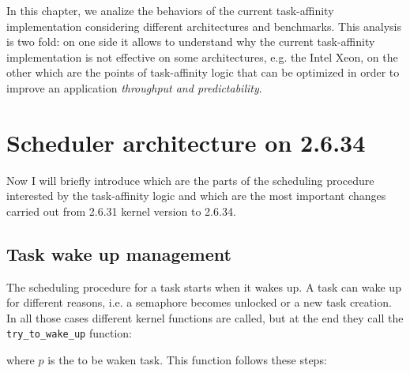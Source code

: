 In this chapter, we analize the behaviors of the current task-affinity
implementation considering different architectures and benchmarks.  This
analysis is two fold: on one side it allows to understand why the current
task-affinity implementation is not effective on some architectures, e.g. the
Intel Xeon, on the other which are the points of task-affinity logic that can be
optimized in order to improve an application \emph{throughput and
predictability}.

\section{Scheduler architecture on 2.6.34}

Now I will briefly introduce which are the parts of the scheduling procedure 
interested by the task-affinity logic and which are the most important changes 
carried out from 2.6.31 kernel version to 2.6.34.

\subsection{Task wake up management}

The scheduling procedure for a task starts when it wakes up. A task can wake up
for different reasons, i.e. a semaphore becomes unlocked or a new task creation.  In all those cases different
kernel functions are called, but at the end they call the \texttt{try\_to\_wake\_up} function:

\lstset{basicstyle=\footnotesize, language=c, captionpos=b, frame=single, label=lis:APIttwu}


where $p$ is the to be waken task.
This function follows these steps:

